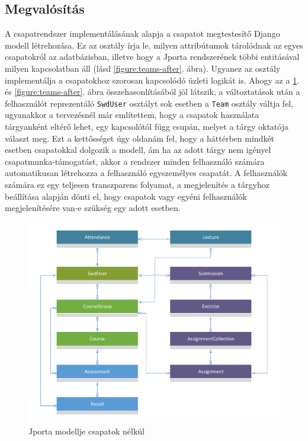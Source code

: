 \subsection{Megvalósítás}
A csapatrendszer implementálásának alapja a csapatot megtestesítő Django modell létrehozása.
Ez az osztály írja le, milyen attribútumok tárolódnak az egyes csapatokról az adatbázisban, illetve hogy a Jporta rendszerének többi entitásával milyen kapcsolatban áll (lásd \ref{figure:teams-after}. ábra).
Ugyanez az osztály implementálja a csapatokhoz szorosan kapcsolódó üzleti logikát is.
Ahogy az a \ref{figure:teams-before}. és \ref{figure:teams-after}. ábra összehasonlításából jól látszik, a változtatások után a felhasználót reprezentáló \texttt{SwdUser} osztályt sok esetben a \texttt{Team} osztály váltja fel, ugyanakkor a tervezésnél már említettem, hogy a csapatok használata tárgyanként eltérő lehet, egy kapcsolótól függ csupán, melyet a tárgy oktatója választ meg.
Ezt a kettősséget úgy oldanám fel, hogy a háttérben mindkét esetben csapatokkal dolgozik a modell, ám ha az adott tárgy nem igényel csapatmunka-támogatást, akkor a rendszer minden felhasználó számára automatikusan létrehozza a felhasználó egyszemélyes csapatát.
A felhasználók számára ez egy teljesen transzparens folyamat, a megjelenítés a tárgyhoz beállítása alapján dönti el, hogy csapatok vagy egyéni felhasználók megjelenítésére van-e szükség egy adott esetben.

\begin{figure}[h]
    \centering
    \includegraphics[width=\textwidth]{figures/teams-before}
    \caption{Jporta modellje csapatok nélkül}
    \label{figure:teams-before}
\end{figure}

